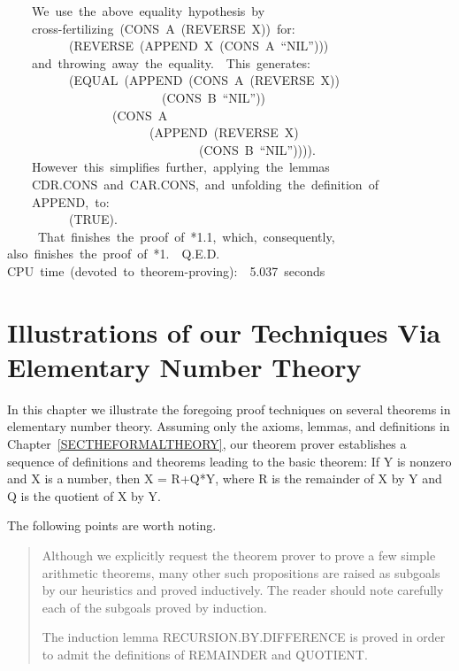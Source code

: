 \documentclass[11pt]{book}
\newenvironment{pubasis}{\begin{flushleft}\ttfamily\small}{\normalsize\rmfamily\end{flushleft}}
\newenvironment{pubcrown}{\begin{quote}}{\end{quote}}
\newcommand{\pubdefaulttextsize}{\large}
\begin{document}
\begin{pubasis}
~~~~We~use~the~above~equality~hypothesis~by\\
~~~~cross-fertilizing~(CONS~A~(REVERSE~X))~for:\\
~~~~~~~~~~(REVERSE~(APPEND~X~(CONS~A~``NIL'')))\\
~~~~and~throwing~away~the~equality.~~This~generates:\\

~~~~~~~~~~(EQUAL~(APPEND~(CONS~A~(REVERSE~X))\\
~~~~~~~~~~~~~~~~~~~~~~~~~(CONS~B~``NIL''))\\
~~~~~~~~~~~~~~~~~(CONS~A\\
~~~~~~~~~~~~~~~~~~~~~~~(APPEND~(REVERSE~X)\\
~~~~~~~~~~~~~~~~~~~~~~~~~~~~~~~(CONS~B~``NIL'')))).\\

~~~~However~this~simplifies~further,~applying~the~lemmas\\
~~~~CDR.CONS~and~CAR.CONS,~and~unfolding~the~definition~of\\
~~~~APPEND,~to:\\

~~~~~~~~~~(TRUE).\\

~~~~~That~finishes~the~proof~of~*1.1,~which,~consequently,\\
also~finishes~the~proof~of~*1.~~Q.E.D.\\

CPU~time~(devoted~to~theorem-proving):~~5.037~seconds\\
\end{pubasis}
\chapter{Illustrations of our Techniques Via Elementary Number Theory}
\label{SECELEMENTARY}
\pubdefaulttextsize
In this chapter we illustrate the foregoing proof
techniques on several theorems in elementary number theory.
Assuming only the axioms, lemmas, and definitions
in Chapter~\ref{SECTHEFORMALTHEORY}, our theorem
prover establishes a sequence of definitions and
theorems leading to the basic theorem:
If Y is nonzero and X is a number, then X = R+Q*Y,
where R is the remainder of X by Y and Q is the quotient of
X by Y.

The following points are worth noting.
\begin{pubcrown}
Although we explicitly request the theorem prover to prove a few simple
arithmetic theorems, many other such propositions
are raised as subgoals by our heuristics
and proved inductively.  The reader should note carefully
each of the subgoals proved by induction.

The induction lemma RECURSION.BY.DIF\-FER\-ENCE is proved in order to admit
the definitions of REMAINDER and QUOTIENT.
\end{pubcrown}
\end{document}
